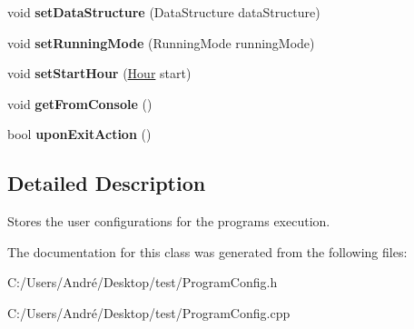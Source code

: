\begin{DoxyCompactItemize}
\item 
\hypertarget{class_program_config_a03787f2856673d700a5d04a9c7bb194e}{}void {\bfseries set\+Data\+Structure} (Data\+Structure data\+Structure)\label{class_program_config_a03787f2856673d700a5d04a9c7bb194e}

\item 
\hypertarget{class_program_config_aea84cce034f1b30e3231254028f7dbfe}{}void {\bfseries set\+Running\+Mode} (Running\+Mode running\+Mode)\label{class_program_config_aea84cce034f1b30e3231254028f7dbfe}

\item 
\hypertarget{class_program_config_a36f7574c78063a11777bc65d7822b602}{}void {\bfseries set\+Start\+Hour} (\hyperlink{class_hour}{Hour} start)\label{class_program_config_a36f7574c78063a11777bc65d7822b602}

\item 
\hypertarget{class_program_config_a04c3f32f627abf6ba27be5281b8dad47}{}void {\bfseries get\+From\+Console} ()\label{class_program_config_a04c3f32f627abf6ba27be5281b8dad47}

\item 
\hypertarget{class_program_config_af244c6ad33a0ed742eab41ac68c4424a}{}bool {\bfseries upon\+Exit\+Action} ()\label{class_program_config_af244c6ad33a0ed742eab41ac68c4424a}

\end{DoxyCompactItemize}


\subsection{Detailed Description}
Stores the user configurations for the program\textquotesingle{}s execution. 

The documentation for this class was generated from the following files\+:\begin{DoxyCompactItemize}
\item 
C\+:/\+Users/\+André/\+Desktop/test/Program\+Config.\+h\item 
C\+:/\+Users/\+André/\+Desktop/test/Program\+Config.\+cpp\end{DoxyCompactItemize}
